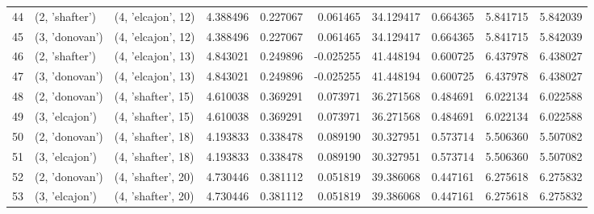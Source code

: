 \begin{tabular}{lllrrrrrrr}
44 &   (2, 'shafter') &  (4, 'elcajon', 12) &  4.388496 &   0.227067 &  0.061465 &   34.129417 &  0.664365 &   5.841715 &   5.842039 \\
45 &   (3, 'donovan') &  (4, 'elcajon', 12) &  4.388496 &   0.227067 &  0.061465 &   34.129417 &  0.664365 &   5.841715 &   5.842039 \\
46 &   (2, 'shafter') &  (4, 'elcajon', 13) &  4.843021 &   0.249896 & -0.025255 &   41.448194 &  0.600725 &   6.437978 &   6.438027 \\
47 &   (3, 'donovan') &  (4, 'elcajon', 13) &  4.843021 &   0.249896 & -0.025255 &   41.448194 &  0.600725 &   6.437978 &   6.438027 \\
48 &   (2, 'donovan') &  (4, 'shafter', 15) &  4.610038 &   0.369291 &  0.073971 &   36.271568 &  0.484691 &   6.022134 &   6.022588 \\
49 &   (3, 'elcajon') &  (4, 'shafter', 15) &  4.610038 &   0.369291 &  0.073971 &   36.271568 &  0.484691 &   6.022134 &   6.022588 \\
50 &   (2, 'donovan') &  (4, 'shafter', 18) &  4.193833 &   0.338478 &  0.089190 &   30.327951 &  0.573714 &   5.506360 &   5.507082 \\
51 &   (3, 'elcajon') &  (4, 'shafter', 18) &  4.193833 &   0.338478 &  0.089190 &   30.327951 &  0.573714 &   5.506360 &   5.507082 \\
52 &   (2, 'donovan') &  (4, 'shafter', 20) &  4.730446 &   0.381112 &  0.051819 &   39.386068 &  0.447161 &   6.275618 &   6.275832 \\
53 &   (3, 'elcajon') &  (4, 'shafter', 20) &  4.730446 &   0.381112 &  0.051819 &   39.386068 &  0.447161 &   6.275618 &   6.275832 \\
\bottomrule
\end{tabular}
